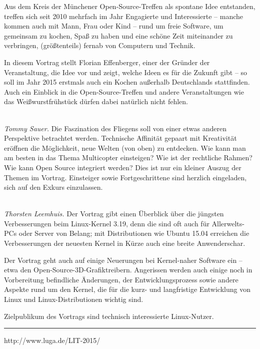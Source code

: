 \documentclass[10pt,a4paper,ngerman]{scrartcl}
\let\origdescription\description
\renewenvironment{description}{
  \setlength{\leftmargini}{0em}
  \origdescription
  \setlength{\itemindent}{0em}
  \setlength{\itemsep}{1.2em}
  \setlength{\labelsep}{\textwidth}
}
{\endlist}
\newcommand{\vorschub}{\mbox{}\\[-0.5em]}
\begin{document}
\begin{multicols*}{2}
\begin{description}
Aus dem Kreis der Münchener Open-Source-Treffen als spontane Idee entstanden, treffen sich seit 2010 mehrfach im Jahr Engagierte und Interessierte – manche kommen auch mit Mann, Frau oder Kind – rund um freie Software, um gemeinsam zu kochen, Spaß zu haben und eine schöne Zeit miteinander zu verbringen, (größtenteils) fernab von Computern und Technik.

In diesem Vortrag stellt Florian Effenberger, einer der Gründer der Veranstaltung, die Idee vor und zeigt, welche Ideen es für die Zukunft gibt – so soll im Jahr 2015 erstmals auch ein Kochen außerhalb Deutschlands stattfinden. Auch ein Einblick in die Open-Source-Treffen und andere Veranstaltungen wie das Weißwurstfrühstück dürfen dabei natürlich nicht fehlen.

\item[Multicopter -- nur Fliegen ist schöner]\vorschub
\textsl{Tommy Sauer.}
Die Faszination des Fliegens soll von einer etwas anderen Perspektive betrachtet werden. Technische Affinität gepaart mit Kreativität eröffnen die Möglichkeit, neue Welten (von oben) zu entdecken. Wie kann man am besten in das Thema Multicopter einsteigen? Wie ist der rechtliche Rahmen? Wie kann Open Source integriert werden? Dies ist nur ein kleiner Auszug der Themen im Vortrag. Einsteiger sowie Fortgeschrittene sind herzlich eingeladen, sich auf den Exkurs einzulassen.


\item[Aktuelle Entwicklungen beim Linux-Kernel]\vorschub
\textsl{Thorsten Leemhuis.}
Der Vortrag gibt einen Überblick über die jüngsten Verbesserungen beim Linux-Kernel 3.19, denn die sind oft auch für Allerwelts-PCs oder Server von Belang; mit Distributionen wie Ubuntu 15.04 erreichen die Verbesserungen der neuesten Kernel in Kürze auch eine breite Anwenderschar.

Der Vortrag geht auch auf einige Neuerungen bei Kernel-naher Software ein – etwa den Open-Source-3D-Grafiktreibern. Angerissen werden auch einige noch in Vorbereitung befindliche Änderungen, der Entwicklungsprozess sowie andere Aspekte rund um den Kernel, die für die kurz- und langfristige Entwicklung von Linux und Linux-Distributionen wichtig sind.

Zielpublikum des Vortrags sind technisch interessierte Linux-Nutzer.

\end{description}


\vspace{10em}
\raggedleft\rule{0.7\linewidth}{0.25pt}
\scriptsize

\raggedleft\textsf{http://www.luga.de/LIT-2015/}

\end{multicols*}
\end{document}
